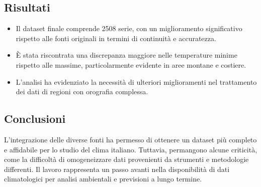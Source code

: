 \documentclass[
]{article}
\providecommand{\tightlist}{%
  \setlength{\itemsep}{0pt}\setlength{\parskip}{0pt}}
\begin{document}
\subsection{Risultati}\label{risultati}

\begin{itemize}
\tightlist
\item
  Il dataset finale comprende 2508 serie, con un miglioramento
  significativo rispetto alle fonti originali in termini di continuità e
  accuratezza.
\item
  È stata riscontrata una discrepanza maggiore nelle temperature minime
  rispetto alle massime, particolarmente evidente in aree montane e
  costiere.
\item
  L'analisi ha evidenziato la necessità di ulteriori miglioramenti nel
  trattamento dei dati di regioni con orografia complessa.
\end{itemize}

\subsection{Conclusioni}\label{conclusioni}

L'integrazione delle diverse fonti ha permesso di ottenere un dataset
più completo e affidabile per lo studio del clima italiano. Tuttavia,
permangono alcune criticità, come la difficoltà di omogeneizzare dati
provenienti da strumenti e metodologie differenti. Il lavoro rappresenta
un passo avanti nella disponibilità di dati climatologici per analisi
ambientali e previsioni a lungo termine.
\end{document}
